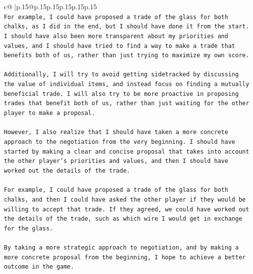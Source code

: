 \documentclass{article}
\begin{document}
{\begin{supertabular}{c@{$\;$}|p{.15\linewidth}@{}p{.15\linewidth}p{.15\linewidth}p{.15\linewidth}p{.15\linewidth}p{.15\linewidth}}
{{{\\ 
\texttt{For example, I could have proposed a trade of the glass for both chalks, as I did in the end, but I should have done it from the start. I should have also been more transparent about my priorities and values, and I should have tried to find a way to make a trade that benefits both of us, rather than just trying to maximize my own score.} \\
\\ 
\texttt{Additionally, I will try to avoid getting sidetracked by discussing the value of individual items, and instead focus on finding a mutually beneficial trade. I will also try to be more proactive in proposing trades that benefit both of us, rather than just waiting for the other player to make a proposal.} \\
\\ 
\texttt{However, I also realize that I should have taken a more concrete approach to the negotiation from the very beginning. I should have started by making a clear and concise proposal that takes into account the other player's priorities and values, and then I should have worked out the details of the trade.} \\
\\ 
\texttt{For example, I could have proposed a trade of the glass for both chalks, and then I could have asked the other player if they would be willing to accept that trade. If they agreed, we could have worked out the details of the trade, such as which wire I would get in exchange for the glass.} \\
\\ 
\texttt{By taking a more strategic approach to negotiation, and by making a more concrete proposal from the beginning, I hope to achieve a better outcome in the game.} \\
            }
        }
    }
     \\ \\

\end{supertabular}
}
\end{document}
